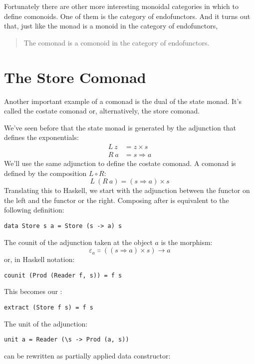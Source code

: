 Fortunately there are other more interesting monoidal categories in
which to define comonoids. One of them is the category of endofunctors.
And it turns out that, just like the monad is a monoid in the category
of endofunctors,

\begin{quote}
The comonad is a comonoid in the category of endofunctors.
\end{quote}

\section{The Store Comonad}

Another important example of a comonad is the dual of the state monad.
It's called the costate comonad or, alternatively, the store comonad.

We've seen before that the state monad is generated by the adjunction
that defines the exponentials:
\begin{align*}
L\ z &= z\times{}s \\
R\ a &= s \Rightarrow a
\end{align*}
We'll use the same adjunction to define the costate comonad. A comonad
is defined by the composition $L \circ R$:
\[L\ (R\ a) = (s \Rightarrow a)\times{}s\]
Translating this to Haskell, we start with the adjunction between the
 functor on the left and the  functor or the
right. Composing  after  is equivalent to
the following definition:

\begin{Verbatim}
data Store s a = Store (s -> a) s
\end{Verbatim}
The counit of the adjunction taken at the object $a$ is the
morphism:
\[\varepsilon_a \Colon ((s \Rightarrow a)\times{}s) \to a\]
or, in Haskell notation:

\begin{Verbatim}
counit (Prod (Reader f, s)) = f s
\end{Verbatim}
This becomes our :

\begin{Verbatim}
extract (Store f s) = f s
\end{Verbatim}
The unit of the adjunction:

\begin{Verbatim}
unit a = Reader (\s -> Prod (a, s))
\end{Verbatim}
can be rewritten as partially applied data constructor:

